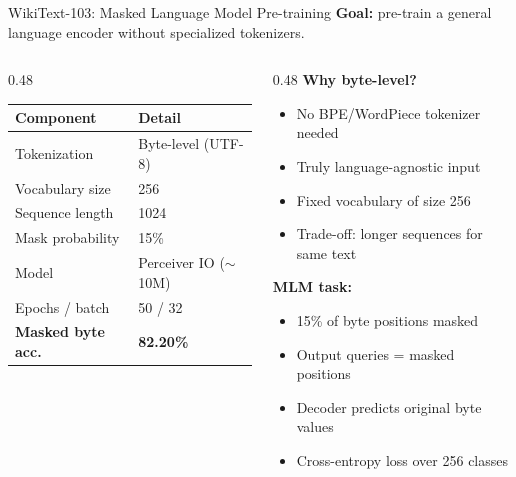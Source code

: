 \documentclass[aspectratio=169,11pt]{beamer}
\begin{document}
\begin{frame}[shrink=5]{WikiText-103: Masked Language Model Pre-training}
  \textbf{Goal:} pre-train a general language encoder without specialized tokenizers.

  \vspace{0.3em}
  \begin{columns}[T]
    \begin{column}{0.48\textwidth}
      \begin{table}
        \centering\small
        \begin{tabular}{ll}
          \toprule
          \textbf{Component} & \textbf{Detail} \\
          \midrule
          Tokenization & Byte-level (UTF-8) \\
          Vocabulary size & 256 \\
          Sequence length & 1024 \\
          Mask probability & 15\% \\
          Model & Perceiver IO ($\sim$10M) \\
          Epochs / batch & 50 / 32 \\
          \midrule
          \textbf{Masked byte acc.} & \textbf{82.20\%} \\
          \bottomrule
        \end{tabular}
      \end{table}
    \end{column}
    \begin{column}{0.48\textwidth}
      \textbf{Why byte-level?}
      \begin{itemize}
        \item No BPE/WordPiece tokenizer needed
        \item Truly language-agnostic input
        \item Fixed vocabulary of size 256
        \item Trade-off: longer sequences for same text
      \end{itemize}

      \vspace{0.5em}
      \textbf{MLM task:}
      \begin{itemize}
        \item 15\% of byte positions masked
        \item Output queries = masked positions
        \item Decoder predicts original byte values
        \item Cross-entropy loss over 256 classes
      \end{itemize}
    \end{column}
  \end{columns}
\end{frame}
\end{document}
